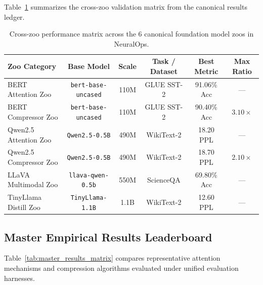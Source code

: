 \documentclass{article}
\begin{document}
Table~\ref{tab:six_zoo_summary} summarizes the cross-zoo validation matrix from the canonical results ledger.

\begin{table}[ht]
\centering
\small
\caption{Cross-zoo performance matrix across the 6 canonical foundation model zoos in NeuralOps.}
\label{tab:six_zoo_summary}
\begin{tabular}{lccccc}
\toprule
\textbf{Zoo Category} & \textbf{Base Model} & \textbf{Scale} & \textbf{Task / Dataset} & \textbf{Best Metric} & \textbf{Max Ratio} \\
\midrule
BERT Attention Zoo & \texttt{bert-base-uncased} & 110M & GLUE SST-2 & 91.06\% Acc & --- \\
BERT Compressor Zoo & \texttt{bert-base-uncased} & 110M & GLUE SST-2 & 90.40\% Acc & $3.10\times$ \\
Qwen2.5 Attention Zoo & \texttt{Qwen2.5-0.5B} & 490M & WikiText-2 & 18.20 PPL & --- \\
Qwen2.5 Compressor Zoo & \texttt{Qwen2.5-0.5B} & 490M & WikiText-2 & 18.70 PPL & $2.10\times$ \\
LLaVA Multimodal Zoo & \texttt{llava-qwen-0.5b} & 550M & ScienceQA & 69.80\% Acc & --- \\
TinyLlama Distill Zoo & \texttt{TinyLlama-1.1B} & 1.1B & WikiText-2 & 12.60 PPL & --- \\
\bottomrule
\end{tabular}
\end{table}

\subsection{Master Empirical Results Leaderboard}
Table~\ref{tab:master_results_matrix} compares representative attention mechanisms and compression algorithms evaluated under unified evaluation harnesses.
\end{document}
